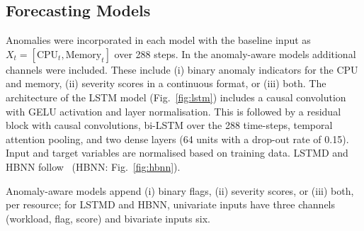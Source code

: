 \documentclass[conference]{IEEEtran}
\begin{document}
\begin{table}[!t]
\caption{Detector settings by pipeline.}
\label{tab:hparams}
\centering
\scriptsize
\setlength{\tabcolsep}{3pt}
\end{table}

\subsection{Forecasting Models}\label{forecasting-models-1}

Anomalies were incorporated in each model with the baseline input as $X_t=[\mathrm{CPU}_t,\mathrm{Memory}_t]$ over 288 steps. In the anomaly-aware models additional channels were included. These include (i) binary anomaly indicators for the CPU and memory, (ii) severity scores in a continuous format, or (iii) both. The architecture of the LSTM model (Fig.~\ref{fig:lstm}) includes a causal convolution with GELU activation and layer normalisation. This is followed by a residual block with causal convolutions, bi-LSTM over the 288 time-steps, temporal attention pooling, and two dense layers (64 units with a drop-out rate of 0.15). Input and target variables are normalised based on training data. LSTMD and HBNN follow~\cite{ref1}
(HBNN: Fig.~\ref{fig:hbnn}).

Anomaly-aware models append (i) binary flags, (ii) severity scores, or (iii)
both, per resource; for LSTMD and HBNN, univariate inputs have three channels
(workload, flag, score) and bivariate inputs six.
\end{document}
